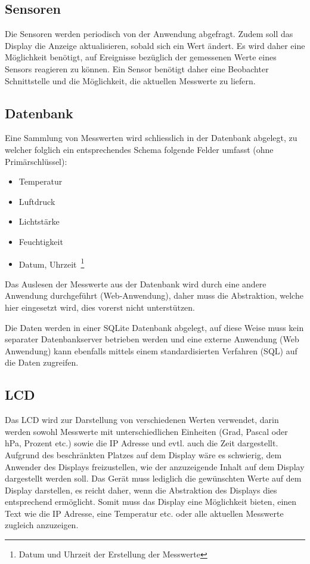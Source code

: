 \documentclass[
    10pt,
    a4paper,
]{scrartcl}
\begin{document}
\subsection{Sensoren}
Die Sensoren werden periodisch von der Anwendung abgefragt. Zudem soll das Display die
Anzeige aktualisieren, sobald sich ein Wert ändert. Es wird daher eine Möglichkeit
benötigt, auf Ereignisse bezüglich der gemessenen Werte eines Sensors reagieren zu können.
Ein Sensor benötigt daher eine Beobachter Schnittstelle und die Möglichkeit, die aktuellen
Messwerte zu liefern.

\subsection{Datenbank}
Eine Sammlung von Messwerten wird schliesslich in der Datenbank abgelegt, zu welcher
folglich ein entsprechendes Schema folgende Felder umfasst (ohne Primärschlüssel):
\begin{itemize}
    \item Temperatur
    \item Luftdruck
    \item Lichtstärke
    \item Feuchtigkeit
    \item Datum, Uhrzeit~\footnote{Datum und Uhrzeit der Erstellung der Messwerte}
\end{itemize}

Das Auslesen der Messwerte aus der Datenbank wird durch eine andere Anwendung durchgeführt
(Web-Anwendung), daher muss die Abstraktion, welche hier eingesetzt wird, dies vorerst
nicht unterstützen.

Die Daten werden in einer SQLite Datenbank abgelegt, auf diese Weise muss kein separater
Datenbankserver betrieben werden und eine externe Anwendung (Web Anwendung) kann ebenfalls
mittels einem standardisierten Verfahren (SQL) auf die Daten zugreifen.

\subsection{LCD}
Das LCD wird zur Darstellung von verschiedenen Werten verwendet, darin werden sowohl
Messwerte mit unterschiedlichen Einheiten (Grad, Pascal oder hPa, Prozent etc.) sowie die
IP Adresse und evtl. auch die Zeit dargestellt. Aufgrund des beschränkten Platzes auf dem
Display wäre es schwierig, dem Anwender des Displays freizustellen, wie der anzuzeigende
Inhalt auf dem Display dargestellt werden soll. Das Gerät muss lediglich die gewünschten
Werte auf dem Display darstellen, es reicht daher, wenn die Abstraktion des Displays dies
entsprechend ermöglicht. Somit muss das Display eine Möglichkeit bieten, einen Text wie
die IP Adresse, eine Temperatur etc. oder alle aktuellen Messwerte zugleich anzuzeigen.
\end{document}
